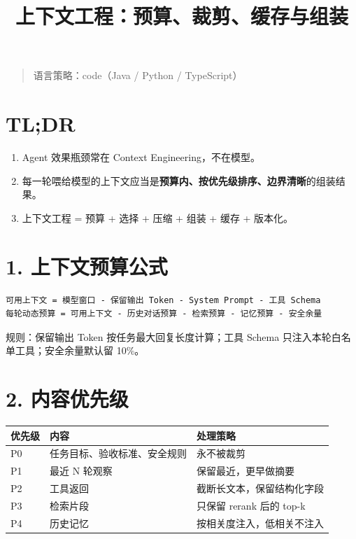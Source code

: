 \documentclass[9pt,a4paper,twocolumn]{ctexart}
\begin{document}
\title{上下文工程：预算、裁剪、缓存与组装}
\date{}
\maketitle
{}

\begin{quote}
语言策略：code（Java / Python / TypeScript）
\end{quote}



\section*{TL;DR}

\begin{enumerate}[itemsep=1pt, topsep=2pt]
  \item Agent 效果瓶颈常在 Context Engineering，不在模型。
  \item 每一轮喂给模型的上下文应当是\textbf{预算内、按优先级排序、边界清晰}的组装结果。
  \item 上下文工程 = 预算 + 选择 + 压缩 + 组装 + 缓存 + 版本化。
\end{enumerate}


\section*{1. 上下文预算公式}


\begin{lstlisting}
可用上下文 = 模型窗口 - 保留输出 Token - System Prompt - 工具 Schema
每轮动态预算 = 可用上下文 - 历史对话预算 - 检索预算 - 记忆预算 - 安全余量
\end{lstlisting}



规则：保留输出 Token 按任务最大回复长度计算；工具 Schema 只注入本轮白名单工具；安全余量默认留 10\%。



\section*{2. 内容优先级}

{\footnotesize
\begin{tabular}{|p{}|p{}|p{}|}
\hline
\textbf{优先级} & \textbf{内容} & \textbf{处理策略} \\
\hline
P0 & 任务目标、验收标准、安全规则 & 永不被裁剪 \\
\hline
P1 & 最近 N 轮观察 & 保留最近，更早做摘要 \\
\hline
P2 & 工具返回 & 截断长文本，保留结构化字段 \\
\hline
P3 & 检索片段 & 只保留 rerank 后的 top-k \\
\hline
P4 & 历史记忆 & 按相关度注入，低相关不注入 \\
\hline
\end{tabular}
}
\end{document}

